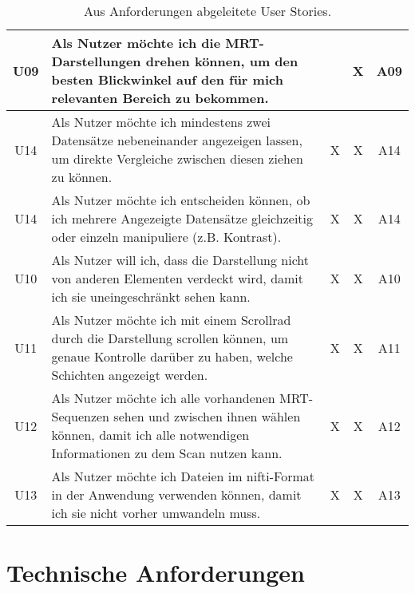 \begin{table}
\begin{tabular}{|c|p{10cm}|c|c|c|}
\hline
U09 & Als Nutzer möchte ich die MRT-Darstellungen drehen können, um den besten Blickwinkel auf den für mich relevanten Bereich zu bekommen. & & X & A09\\
\hline
U14 & Als Nutzer möchte ich mindestens zwei Datensätze nebeneinander angezeigen lassen, um direkte Vergleiche zwischen diesen ziehen zu können. & X & X & A14\\
\hline
U14 & Als Nutzer möchte ich entscheiden können, ob ich mehrere Angezeigte Datensätze gleichzeitig oder einzeln manipuliere (z.B. Kontrast). & X & X & A14\\
\hline
U10 & Als Nutzer will ich, dass die Darstellung nicht von anderen Elementen verdeckt wird, damit ich sie uneingeschränkt sehen kann. & X & X & A10\\
\hline
U11 & Als Nutzer möchte ich mit einem Scrollrad durch die Darstellung scrollen können, um genaue Kontrolle darüber zu haben, welche Schichten angezeigt werden. & X & X & A11\\
\hline
U12 & Als Nutzer möchte ich alle vorhandenen MRT-Sequenzen sehen und zwischen ihnen wählen können, damit ich alle notwendigen Informationen zu dem Scan nutzen kann. & X & X & A12\\
\hline
U13 & Als Nutzer möchte ich Dateien im nifti-Format in der Anwendung verwenden können, damit ich sie nicht vorher umwandeln muss. & X & X & A13\\
\hline


\end{tabular}
\caption{\label{tab:table-name}Aus Anforderungen abgeleitete User Stories.}
\end{table}

\section{Technische Anforderungen}
